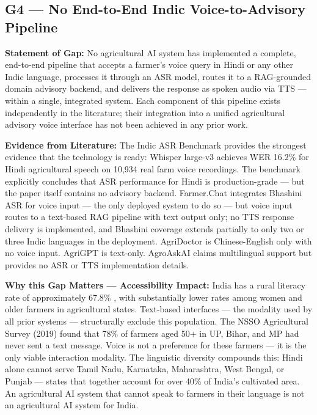 \documentclass[12pt,a4paper]{article}
\begin{document}
\subsection{G4 --- No End-to-End Indic Voice-to-Advisory Pipeline}
\textbf{Statement of Gap:}
No agricultural AI system has implemented a complete, end-to-end pipeline that accepts a farmer's voice query in Hindi or any other Indic language, processes it through an ASR model, routes it to a RAG-grounded domain advisory backend, and delivers the response as spoken audio via TTS --- within a single, integrated system. Each component of this pipeline exists independently in the literature; their integration into a unified agricultural advisory voice interface has not been achieved in any prior work.

\noindent\textbf{Evidence from Literature:}
The Indic ASR Benchmark \cite{indicasr2025} provides the strongest evidence that the technology is ready: Whisper large-v3 achieves WER 16.2\% for Hindi agricultural speech on 10,934 real farm voice recordings. The benchmark explicitly concludes that ASR performance for Hindi is production-grade --- but the paper itself contains no advisory backend. Farmer.\allowbreak Chat \cite{farmerchat2024} integrates Bhashini ASR for voice input --- the only deployed system to do so --- but voice input routes to a text-based RAG pipeline with text output only; no TTS response delivery is implemented, and Bhashini coverage extends partially to only two or three Indic languages in the deployment. AgriDoctor \cite{agridoctor2025} is Chinese-English only with no voice input. AgriGPT \cite{agrigpt2025} is text-only. AgroAskAI \cite{agroaskai2024} claims multilingual support but provides no ASR or TTS implementation details.

\noindent\textbf{Why this Gap Matters --- Accessibility Impact:}
India has a rural literacy rate of approximately 67.8\% \cite{census2021}, with substantially lower rates among women and older farmers in agricultural states. Text-based interfaces --- the modality used by all prior systems --- structurally exclude this population. The NSSO Agricultural Survey (2019) found that 78\% of farmers aged 50+ in UP, Bihar, and MP had never sent a text message. Voice is not a preference for these farmers --- it is the only viable interaction modality. The linguistic diversity compounds this: Hindi alone cannot serve Tamil Nadu, Karnataka, Maharashtra, West Bengal, or Punjab --- states that together account for over 40\% of India's cultivated area. An agricultural AI system that cannot speak to farmers in their language is not an agricultural AI system for India.
\end{document}
